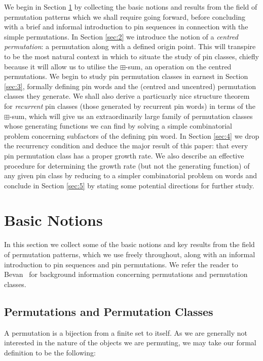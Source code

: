 \documentclass[11pt,a4paper]{article}
\theoremstyle{definition}
\begin{document}
We begin in Section \ref{sec:1} by collecting the basic notions and results from the field of permutation patterns which we shall require going forward, before concluding with a brief and informal introduction to pin sequences in connection with the simple permutations. In Section \ref{sec:2} we introduce the notion of a \emph{centred permutation}: a permutation along with a defined origin point. This will transpire to be the most natural context in which to situate the study of pin classes, chiefly because it will allow us to utilise the $\boxplus$-sum, an operation on the centred permutations. We begin to study pin permutation classes in earnest in Section \ref{sec:3}, formally defining pin words and the (centred and uncentred) permutation classes they generate. We shall also derive a particuarly nice structure theorem for \emph{recurrent} pin classes (those generated by recurrent pin words) in terms of the $\boxplus$-sum, which will give us an extraordinarily large family of permutation classes whose generating functions we can find by solving a simple combinatorial problem concerning subfactors of the defining pin word. In Section \ref{sec:4} we drop the recurrency condition and deduce the major result of this paper: that every pin permutation class has a proper growth rate. We also describe an effective procedure for determining the growth rate (but not the generating function) of any given pin class by reducing to a simpler combinatorial problem on words and conclude in Section \ref{sec:5} by stating some potential directions for further study.

\tableofcontents

\section{Basic Notions} \label{sec:1}

In this section we collect some of the basic notions and key results from the field of permutation patterns, which we use freely throughout, along with an informal introduction to pin sequences and pin permutations. We refer the reader to Bevan~\cite{bevan2015defs} for background information concerning permutations and permutation classes.

\subsection{Permutations and Permutation Classes} \label{sec:1.1}

A permutation is a bijection from a finite set to itself. As we are generally not interested in the nature of the objects we are permuting, we may take our formal definition to be the following:
\end{document}
